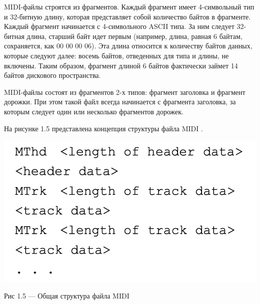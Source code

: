 MIDI-файлы строятся из фрагментов. Каждый фрагмент имеет 4-символьный тип и 32-битную длину, которая представляет собой количество байтов в фрагменте. Каждый фрагмент начинается с 4-символьного ASCII типа. За ним следует 32-битная длина, старший байт идет первым (например, длина, равная 6 байтам, сохраняется, как 00 00 00 06). Эта длина относится к количеству байтов данных, которые следуют далее: восемь байтов, отведенных для типа и длины, не включены. Таким образом, фрагмент длиной 6 байтов фактически займет 14 байтов дискового пространства.

MIDI-файлы состоят из фрагментов 2-х типов: фрагмент заголовка и фрагмент дорожки. При этом такой файл всегда начинается с фрагмента заголовка, за которым следует один или несколько фрагментов дорожек.

На рисунке 1.5 представлена концепция структуры файла MIDI \cite{SMFFS}.
\begin{center}
		\includegraphics[scale=0.6]{tex/img/MidiStruct.png}
		
			Рис 1.5 — Общая структура файла MIDI
\end{center} 

